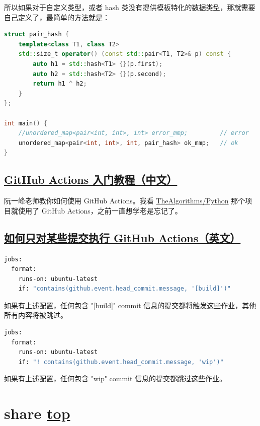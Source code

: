 所以如果对于自定义类型，或者 hash 类没有提供模板特化的数据类型，那就需要自己定义了，最简单的方法就是：

\begin{lstlisting}[language=C++]
struct pair_hash {
	template<class T1, class T2>
	std::size_t operator() (const std::pair<T1, T2>& p) const {
		auto h1 = std::hash<T1> {}(p.first);
		auto h2 = std::hash<T2> {}(p.second);
		return h1 ^ h2;
	}
};

int main() {
	//unordered_map<pair<int, int>, int> error_mmp;			// error
	unordered_map<pair<int, int>, int, pair_hash> ok_mmp;	// ok
}
\end{lstlisting}

\subsection{\href{http://www.ruanyifeng.com/blog/2019/09/getting-started-with-github-actions.html}{GitHub Actions 入门教程（中文）}}

阮一峰老师教你如何使用 GitHub Actions。我看 \href{https://github.com/TheAlgorithms/Python}{TheAlgorithms/Python} 那个项目就使用了 GitHub Actions，之前一直想学老是忘记了。

\subsection{\href{https://ryangjchandler.co.uk/articles/running-github-actions-for-certain-commit-messages}{如何只对某些提交执行 GitHub Actions（英文）}}

\begin{lstlisting}[language=Bash]
jobs:
  format:
    runs-on: ubuntu-latest
    if: "contains(github.event.head_commit.message, '[build]')"
\end{lstlisting}

如果有上述配置，任何包含 "[build]" commit 信息的提交都将触发这些作业，其他所有内容将被跳过。

\begin{lstlisting}[language=Bash]
jobs:
  format:
    runs-on: ubuntu-latest
    if: "! contains(github.event.head_commit.message, 'wip')"
\end{lstlisting}

如果有上述配置，任何包含 "wip" commit 信息的提交都跳过这些作业。

\section{share \hyperref[chap:w2]{top}}\label{w2:share}

